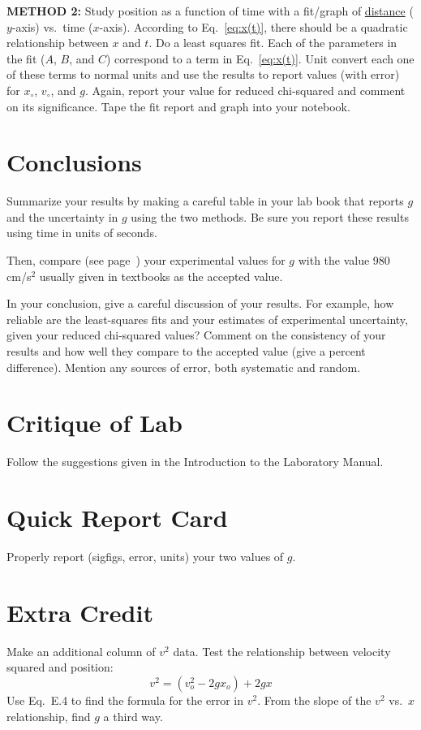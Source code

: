 
{\bf METHOD 2: }
Study position as a function of time with a
fit/graph of \underline{distance} ($y$-axis) vs.\ time ($x$-axis).  
According to Eq.~\ref{eq:x(t)}, there should be a quadratic relationship
between $x$ and $t$.   Do a least squares
fit.  Each of the parameters in the fit ($A$, $B$, and $C$) correspond to
a term in Eq.~\ref{eq:x(t)}.  Unit convert each one of these terms to
normal units and use the results to report values (with error) for
$x_{\circ}$,   $v_{\circ}$, and $g$.
Again, report your value
for reduced chi-squared and comment on its significance. Tape the
fit report and graph into your notebook.



\section*{Conclusions}
Summarize your results by making a careful table in your lab book that
reports $g$ and the uncertainty in $g$ using the two methods. %
Be sure you report these
results using time in units of seconds.

Then, compare (see page~\pageref{scierror}) your experimental values
for $g$
with the value 980 cm/s$^{2}$ usually given in textbooks as the
accepted value.

In your conclusion, give a careful discussion of your results.
For example, how reliable are the least-squares fits and your
estimates of experimental uncertainty, given your reduced chi-squared
values?
Comment on the consistency of your results and how well they compare to the
accepted value (give a percent difference).  Mention any sources of error, both
systematic and random.


\section*{Critique of Lab}
Follow the suggestions given in the Introduction to the
Laboratory Manual.

\section*{Quick Report Card}
Properly report (sigfigs, error, units) your two values of $g$.

\section*{Extra Credit}
Make an additional column of $v^2$ data.  Test the relationship between
velocity squared and position:
\begin{equation}
v^2=(v_o^2-2gx_o)+2gx
\end{equation}
Use Eq.~E.4 to find the formula for the error in $v^2$.  From the slope
of the $v^2$ vs.\ $x$ relationship, find $g$ a third way.

